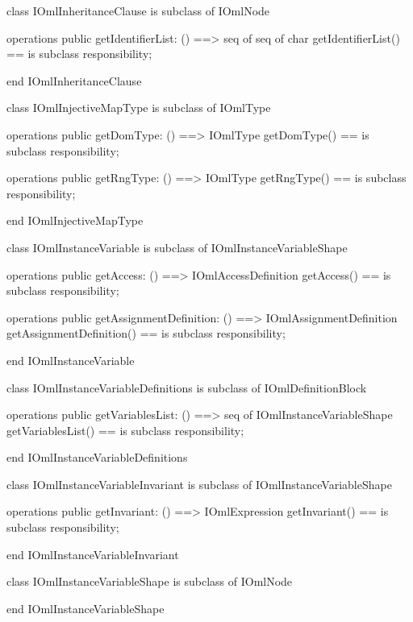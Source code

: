 \begin{vdm_al}
class IOmlInheritanceClause
 is subclass of IOmlNode

operations
  public getIdentifierList: () ==> seq of seq of char
  getIdentifierList() == is subclass responsibility;

end IOmlInheritanceClause
\end{vdm_al}

\begin{vdm_al}
class IOmlInjectiveMapType
 is subclass of IOmlType

operations
  public getDomType: () ==> IOmlType
  getDomType() == is subclass responsibility;

operations
  public getRngType: () ==> IOmlType
  getRngType() == is subclass responsibility;

end IOmlInjectiveMapType
\end{vdm_al}

\begin{vdm_al}
class IOmlInstanceVariable
 is subclass of IOmlInstanceVariableShape

operations
  public getAccess: () ==> IOmlAccessDefinition
  getAccess() == is subclass responsibility;

operations
  public getAssignmentDefinition: () ==> IOmlAssignmentDefinition
  getAssignmentDefinition() == is subclass responsibility;

end IOmlInstanceVariable
\end{vdm_al}

\begin{vdm_al}
class IOmlInstanceVariableDefinitions
 is subclass of IOmlDefinitionBlock

operations
  public getVariablesList: () ==> seq of IOmlInstanceVariableShape
  getVariablesList() == is subclass responsibility;

end IOmlInstanceVariableDefinitions
\end{vdm_al}

\begin{vdm_al}
class IOmlInstanceVariableInvariant
 is subclass of IOmlInstanceVariableShape

operations
  public getInvariant: () ==> IOmlExpression
  getInvariant() == is subclass responsibility;

end IOmlInstanceVariableInvariant
\end{vdm_al}

\begin{vdm_al}
class IOmlInstanceVariableShape
 is subclass of IOmlNode

end IOmlInstanceVariableShape
\end{vdm_al}

